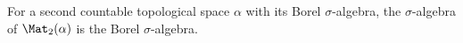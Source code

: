 For a second countable topological space $\alpha$ with its Borel $\sigma$-algebra, the $\sigma$-algebra of $\Mat_2(\alpha)$ is the Borel $\sigma$-algebra.
